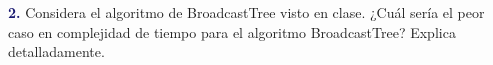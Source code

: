 \newpage
\textbf{\textcolor{MidnightBlue}{2.}}
 Considera el algoritmo de BroadcastTree visto en clase.
 ¿Cuál sería el peor caso en complejidad de tiempo para
 el algoritmo BroadcastTree? Explica detalladamente.
